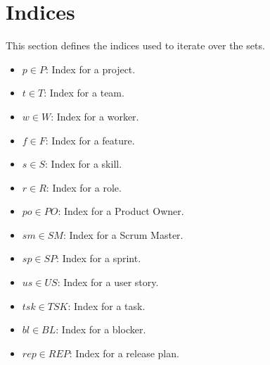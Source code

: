 \documentclass[11pt]{article}
\begin{document}
\section{Indices}
This section defines the indices used to iterate over the sets.
\begin{itemize}
    \item $p \in P$: Index for a project.
    \item $t \in T$: Index for a team.
    \item $w \in W$: Index for a worker.
    \item $f \in F$: Index for a feature.
    \item $s \in S$: Index for a skill.
    \item $r \in R$: Index for a role.
    \item $po \in PO$: Index for a Product Owner.
    \item $sm \in SM$: Index for a Scrum Master.
    \item $sp \in SP$: Index for a sprint.
    \item $us \in US$: Index for a user story.
    \item $tsk \in TSK$: Index for a task.
    \item $bl \in BL$: Index for a blocker.
    \item $rep \in REP$: Index for a release plan.
\end{itemize}
\end{document}
